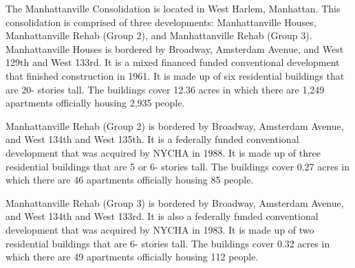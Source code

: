 The Manhattanville Consolidation is located in West Harlem, Manhattan. This consolidation is comprised of three developments: Manhattanville Houses, Manhattanville Rehab (Group 2), and Manhattanville Rehab (Group 3). Manhattanville Houses is bordered by Broadway, Amsterdam Avenue, and West 129th and West 133rd. It is a mixed financed funded conventional development that finished construction in 1961. It is made up of six residential buildings that are 20- stories tall. The buildings cover 12.36 acres in which there are 1,249 apartments officially housing 2,935 people.    \par \vspace{.7\baselineskip}   \par \vspace{.7\baselineskip}Manhattanville Rehab (Group 2) is bordered by Broadway, Amsterdam Avenue, and West 134th and West 135th. It is a federally funded conventional development that was acquired by NYCHA in 1988. It is made up of three residential buildings that are 5 or 6- stories tall. The buildings cover 0.27 acres in which there are 46 apartments officially housing 85 people.    \par \vspace{.7\baselineskip}Manhattanville Rehab (Group 3) is bordered by Broadway, Amsterdam Avenue, and West 134th and West 133rd. It is also a federally funded conventional development that was acquired by NYCHA in 1983. It is made up of two residential buildings that are 6- stories tall. The buildings cover 0.32 acres in which there are 49 apartments officially housing 112 people.